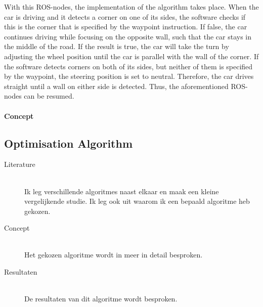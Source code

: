 \documentclass[conference,a4paper]{IEEEtran}
\begin{document}
With this ROS-nodes, the implementation of the algorithm takes place. When the car is driving and it detects a corner on one of its sides, the software checks if this is the corner that is specified by the waypoint instruction. If false, the car continues driving while focusing on the opposite wall, such that the car stays in the middle of the road. If the result is true, the car will take the turn by adjusting the wheel position until the car is parallel with the wall of the corner. If the software detects corners on both of its sides, but neither of them is specified by the waypoint, the steering position is set to neutral. Therefore, the car drives straight until a wall on either side is detected. Thus, the aforementioned ROS-nodes can be resumed.


\paragraph{Concept}

\subsection{Optimisation Algorithm}
\begin{description}
\item[Literature] \hfill \\ Ik leg verschillende algoritmes naast elkaar en maak een kleine vergelijkende studie. Ik leg ook uit waarom ik een bepaald algoritme heb gekozen.

\item[Concept] \hfill \\ Het gekozen algoritme wordt in meer in detail besproken.

\item[Resultaten] \hfill \\ De resultaten van dit algoritme wordt besproken.

\end{description}
\end{document}
